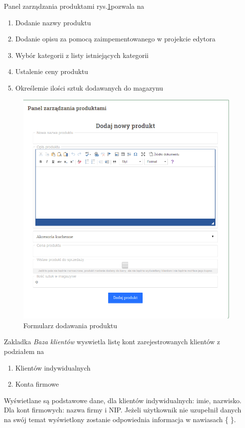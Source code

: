  Panel zarządzania produktami rys.\ref{fig:dod_prod}pozwala na
 \begin{enumerate}
 	\item Dodanie nazwy produktu
 	\item Dodanie opisu za pomocą zaimpementowanego w projekcie edytora
 	\item Wybór kategorii z listy istniejących kategorii
 	\item Ustalenie ceny produktu
 	\item Określemie ilości sztuk dodawanych do magazynu
 	
 \end{enumerate}
 
\begin{figure}[H]
	\centering
	\includegraphics [width=15cm] {fig/dodawanie_produktu}
	\caption{Formularz dodawania produktu}
	\label{fig:dod_prod}
\end{figure}
Zakladka \textit{Baza klientów} wyswietla listę kont zarejestrowanych klientów z podziałem na \begin{enumerate}
	\item Klientów indywidualnych
	\item Konta firmowe
\end{enumerate}
Wyświetlane są podstawowe dane, dla klientów indywidualnych: imie, nazwisko. Dla kont firmowych: nazwa firmy i NIP. Jeżeli użytkownik nie uzupełnił danych na swój temat wyświetlony zostanie odpowiednia informacja w nawiasach \{ \}.
